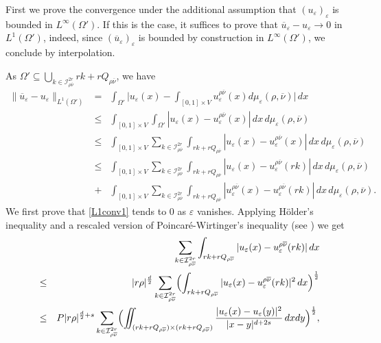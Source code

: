 \documentclass[11pt,a4paper,reqno]{amsart}
\theoremstyle{plain}
\theoremstyle{definition}
\newcommand\e{\varepsilon}
\theoremstyle{remark}
\begin{document}
First we prove the convergence under the additional assumption that $(u_\e)_\e$ is bounded in $L^\infty(\Omega')$.
If this is the case, it suffices to prove that $\overline{u}_\e-u_\e \to 0$ in $L^1(\Omega')$, indeed, since  $(\overline{u}_\e)_\e$ is bounded by construction in $L^{\infty}(\Omega')$, we conclude by interpolation.

\smallskip

As $\Omega' \subseteq \displaystyle\bigcup_{k\in \mathcal{I}^{2r}_{\rho\overline{\nu}}}rk+rQ_{\rho\overline{\nu}}$, we have
\begin{eqnarray} \nonumber
    \|\overline{u}_\e-u_\e\|_{L^1(\Omega')} &=& \int_{\Omega'} \biggl| u_\e(x) -\int_{[0,1]\times V}u_\e^{\rho\overline{\nu}}(x) d\mu_\e(\rho,\overline{\nu})\biggr|\,dx \\ \nonumber
    & \leq & \int_{[0,1]\times V} \int_{\Omega'} |u_\e(x) - u_\e^{\rho\overline{\nu}}(x)|\,dx\,d\mu_\e(\rho,\overline{\nu}) \\ \nonumber 
    & \leq & \int_{[0,1]\times V} \sum_{k\in \mathcal{I}^{2r}_{\rho\overline{\nu}}} \int_{rk+rQ_{\rho\overline{\nu}}} |u_\e(x) - u_\e^{\rho\overline{\nu}}(x)|\,dx\, d\mu_\e(\rho,\overline{\nu}) \\ \label{L1conv1}
    &\leq&  \int_{[0,1]\times V} \sum_{k\in \mathcal{I}^{2r}_{\rho\overline{\nu}}} \int_{rk+rQ_{\rho\overline{\nu}}} |u_\e(x) - u_\e^{\rho\overline{\nu}}(rk)|\,dx\,d\mu_\e(\rho,\overline{\nu}) \\ \label{L1conv2}
    &+& \int_{[0,1]\times V} \sum_{k\in \mathcal{I}^{2r}_{\rho\overline{\nu}}} \int_{rk+rQ_{\rho\overline{\nu}}} |u^{\rho\overline{\nu}}_\e(x) - u_\e^{\rho\overline{\nu}}(rk)|\,dx\,d\mu_\e(\rho,\overline{\nu}).
\end{eqnarray}
We first prove that \eqref{L1conv1} tends to $0$ as $\e$ vanishes. Applying H\"older's inequality and a rescaled version of Poincaré-Wirtinger's inequality (see \cite[Theorem 6.33]{Leoni2023AFC}) we get
\begin{eqnarray*}\label{attempt4} && \hskip-2.5cm\nonumber
    \sum_{k\in \mathcal{I}^{2r}_{\rho\overline{\nu}}} \int_{rk+rQ_{\rho\overline{\nu}}} |u_\e(x) - u_\e^{\rho\overline{\nu}}(rk)|\,dx \\ \nonumber
    &\leq& |r\rho|^{\frac{d}{2}} \sum_{k\in \mathcal{I}^{2r}_{\rho\overline{\nu}}} \Bigl( \int_{rk+rQ_{\rho\overline{\nu}}} |u_\e(x) - u_\e^{\rho\overline{\nu}}(rk)|^2\,dx \Bigr)^{\frac{1}{2}} \\ \nonumber 
    &\leq& P|r\rho|^{\frac{d}{2}+s} \sum_{k\in \mathcal{I}^{2r}_{\rho\overline{\nu}}} \Bigl(\iint_{(rk+rQ_{\rho\overline{\nu}})\times(rk+rQ_{\rho\overline{\nu}})}\frac{|u_\e(x)-u_\e(y)|^2}{|x-y|^{d+2s}}\,dxdy\Bigr)^{\frac{1}{2}},
    \end{eqnarray*} 
\end{document}
